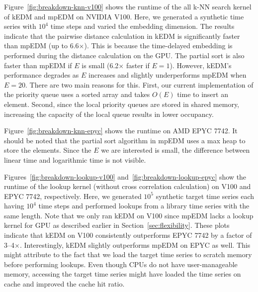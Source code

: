\documentclass[sigconf]{acmart}
\begin{document}
Figure~\ref{fig:breakdown-knn-v100} shows the runtime of the all k-NN search kernel
of kEDM and mpEDM on NVIDIA V100. Here, we generated a synthetic time series with
$10^4$ time steps and varied the embedding dimension.
The results indicate that the pairwise
distance calculation in kEDM is significantly faster than mpEDM (up to
6.6$\times$). This is because the time-delayed embedding is performed during the distance
calculation on the GPU\@. The partial sort is also faster than mpEDM if $E$ is small (6.2$\times$ faster if $E=1$). However, kEDM's performance
degrades as $E$ increases and slightly underperforms mpEDM when $E=20$. There are two main reasons for this. First, our current implementation of the priority queue uses a sorted array and takes $O(E)$ time to insert an element. Second, since the local priority queues are stored in shared memory, increasing the capacity of the local queue results in lower occupancy.

Figure~\ref{fig:breakdown-knn-epyc} shows the runtime 
on AMD EPYC 7742. It should be noted that the partial sort algorithm in mpEDM
uses a max heap to store the elements. Since the $E$ we are interested is
small, the difference between linear time and logarithmic time is not visible.

Figures~\ref{fig:breakdown-lookup-v100} and~\ref{fig:breakdown-lookup-epyc}
show the runtime of the lookup kernel (without cross correlation calculation) on V100 and EPYC 7742, respectively.
Here, we generated $10^5$ synthetic target time series each having $10^4$ time 
steps and performed lookups from a library time series with the same length.
Note that we only ran kEDM on
V100 since mpEDM lacks a lookup kernel for GPU as described earlier in
Section~\ref{sec:flexibility}. These plots indicate that kEDM on V100
consistently outperforms EPYC 7742 by a factor of 3--4$\times$.
Interestingly, kEDM slightly outperforms mpEDM on EPYC as well. 
This might attribute to the fact that we load the target time series to scratch memory before performing
lookups. Even though CPUs do not have user-manageable memory, accessing the
target time series might have loaded the time series on cache and improved the
cache hit ratio.
\end{document}
